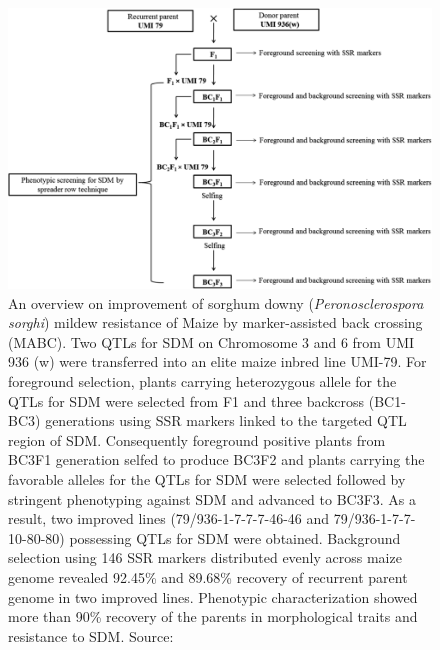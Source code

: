 \documentclass[
  ignorenonframetext,
  aspectratio=169]{beamer}
\begin{document}
\begin{frame}{}
\protect\hypertarget{section-10}{}
\begin{figure}
  \begin{columns}[T,onlytextwidth]

  \begin{center}
  \includegraphics[width=0.94\linewidth]{../images/sorghum_backcross_breeding_marker_assisted.png}
  \end{center}
  
  \caption{\newline An overview on improvement of sorghum downy (\textit{Peronosclerospora sorghi}) mildew resistance of Maize by marker-assisted back crossing (MABC). Two QTLs for SDM on Chromosome 3 and 6 from UMI 936 (w) were transferred into an elite maize inbred line UMI-79. For foreground selection, plants carrying heterozygous allele for the QTLs for SDM were selected from F1 and three backcross (BC1-BC3) generations using SSR markers linked to the targeted QTL region of SDM. Consequently foreground positive plants from BC3F1 generation selfed to produce BC3F2 and plants carrying the favorable alleles for the QTLs for SDM were selected followed by stringent phenotyping against SDM and advanced to BC3F3. As a result, two improved lines (79/936-1-7-7-7-46-46 and 79/936-1-7-7-10-80-80) possessing QTLs for SDM were obtained. Background selection using 146 SSR markers distributed evenly across maize genome revealed 92.45\% and 89.68\% recovery of recurrent parent genome in two improved lines. Phenotypic characterization showed more than 90\% recovery of the parents in morphological traits and resistance to SDM. Source: \cite{sumathi2020introgression}}
  \label{fig:sorghum-mas}
  
  \end{columns}
\end{figure}
\end{frame}
\end{document}
